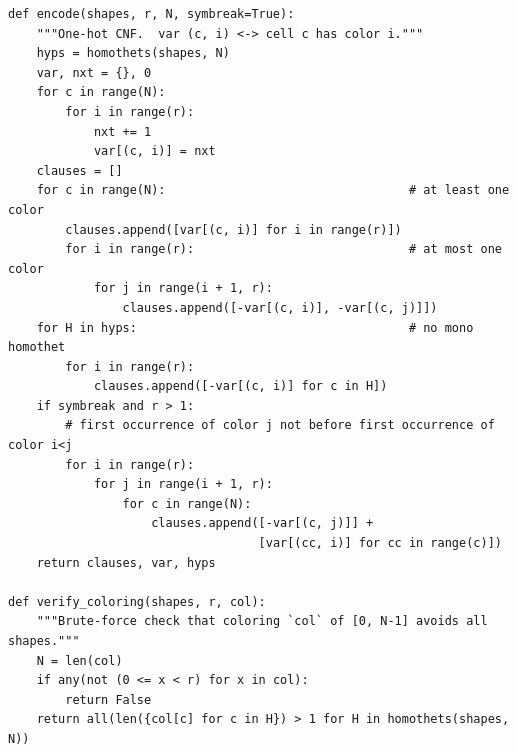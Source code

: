 \documentclass[12pt]{article}
\begin{document}
\begin{lstlisting}[style=plainstyle]
def encode(shapes, r, N, symbreak=True):
    """One-hot CNF.  var (c, i) <-> cell c has color i."""
    hyps = homothets(shapes, N)
    var, nxt = {}, 0
    for c in range(N):
        for i in range(r):
            nxt += 1
            var[(c, i)] = nxt
    clauses = []
    for c in range(N):                                  # at least one color
        clauses.append([var[(c, i)] for i in range(r)])
        for i in range(r):                              # at most one color
            for j in range(i + 1, r):
                clauses.append([-var[(c, i)], -var[(c, j)]])
    for H in hyps:                                      # no mono homothet
        for i in range(r):
            clauses.append([-var[(c, i)] for c in H])
    if symbreak and r > 1:
        # first occurrence of color j not before first occurrence of color i<j
        for i in range(r):
            for j in range(i + 1, r):
                for c in range(N):
                    clauses.append([-var[(c, j)]] +
                                   [var[(cc, i)] for cc in range(c)])
    return clauses, var, hyps

def verify_coloring(shapes, r, col):
    """Brute-force check that coloring `col` of [0, N-1] avoids all shapes."""
    N = len(col)
    if any(not (0 <= x < r) for x in col):
        return False
    return all(len({col[c] for c in H}) > 1 for H in homothets(shapes, N))


\end{lstlisting}
\end{document}
